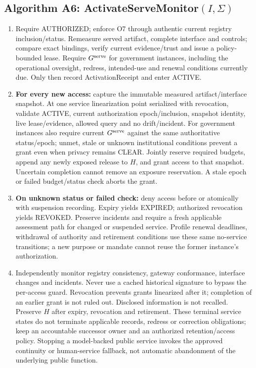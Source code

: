 \subsection{Algorithm A6: ActivateServeMonitor$(I,\Sigma)$}
\begin{enumerate}
\item Require AUTHORIZED; enforce O7 through authentic current registry inclusion/status.
Remeasure served artifact, complete interface and controls; compare exact
bindings, verify current evidence/trust and issue a policy-bounded lease.
Require $G^{\rm serve}$ for government instances, including the operational
oversight, redress, intended-use and renewal conditions currently due.
Only then record ActivationReceipt and enter ACTIVE.
\item \textbf{For every new access:} capture the immutable measured
artifact/interface snapshot. At one service linearization point serialized
with revocation, validate ACTIVE, current authorization epoch/inclusion,
snapshot identity, live lease/evidence, allowed query and no drift/incident.
For government instances also require current $G^{\rm serve}$ against the
same authoritative status/epoch; unmet, stale or unknown institutional
conditions prevent a grant even when privacy remains CLEAR.
Jointly reserve required budgets, append any newly exposed release to $H$,
and grant access to that snapshot. Uncertain completion cannot remove an
exposure reservation. A stale
epoch or failed budget/status check aborts the grant.
\item \textbf{On unknown status or failed check:} deny access before or
atomically with suspension recording. Expiry yields EXPIRED; authorized
revocation yields REVOKED. Preserve incidents and require a fresh applicable
assessment path for changed or suspended service.
Profile renewal deadlines, withdrawal of authority and retirement conditions
use these same no-service transitions; a new purpose or mandate cannot reuse
the former instance's authorization.
\item Independently monitor registry consistency, gateway conformance,
interface changes and incidents. Never use a cached historical signature
to bypass the per-access guard. Revocation prevents grants linearized after
it; completion of an earlier grant is not ruled out. Disclosed information
is not recalled. Preserve $H$ after expiry, revocation and retirement. These
terminal service states do not terminate applicable records, redress or
correction obligations; keep an accountable successor owner and an authorized
retention/access policy. Stopping a model-backed public service invokes the
approved continuity or human-service fallback, not automatic abandonment of
the underlying public function.
\end{enumerate}

